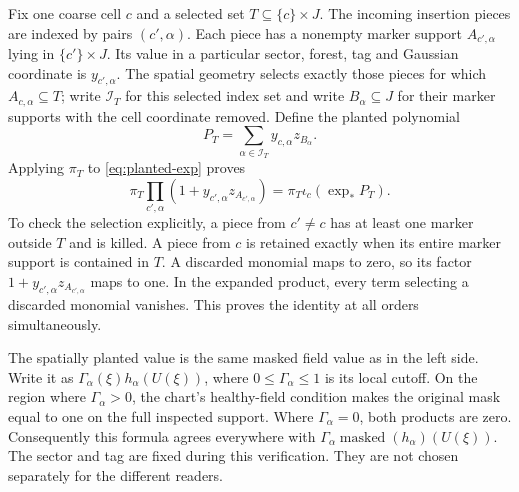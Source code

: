 Fix one coarse cell $c$ and a selected set $T\subseteq\{c\}\times J$.
The incoming insertion pieces are indexed by pairs $(c',\alpha)$.
Each piece has a nonempty marker support $A_{c',\alpha}$ lying in
$\{c'\}\times J$. Its value in a particular sector, forest, tag and
Gaussian coordinate is $y_{c',\alpha}$. The spatial geometry selects
exactly those pieces for which
$A_{c,\alpha}\subseteq T$; write $\mathcal I_T$ for this selected
index set and write $B_\alpha\subseteq J$ for their marker supports
with the cell coordinate removed. Define the planted polynomial
\[
             P_T=\sum_{\alpha\in\mathcal I_T}
                         y_{c,\alpha}z_{B_\alpha}.
\]
Applying $\pi_T$ to \eqref{eq:planted-exp} proves
\begin{equation}\label{eq:planted-selection}
 \pi_T\prod_{c',\alpha}(1+y_{c',\alpha}z_{A_{c',\alpha}})
           =\pi_T\iota_c(\exp_*P_T).
\end{equation}
To check the selection explicitly, a piece from $c'\ne c$ has at least
one marker outside $T$ and is killed. A piece from $c$ is retained
exactly when its entire marker support is contained in $T$. A discarded
monomial maps to zero, so its factor $1+y_{c',\alpha}z_{A_{c',\alpha}}$
maps to one. In the expanded product, every term selecting a discarded
monomial vanishes. This proves the identity at all orders simultaneously.

The spatially planted value is the same masked field value as in the
left side. Write it as $\Gamma_\alpha(\xi)h_\alpha(U(\xi))$, where
$0\le\Gamma_\alpha\le1$ is its local cutoff. On the region where
$\Gamma_\alpha>0$, the chart's healthy-field condition makes the original
mask equal to one on the full inspected support. Where
$\Gamma_\alpha=0$, both products are zero. Consequently this formula
agrees everywhere with
$\Gamma_\alpha\operatorname{masked}(h_\alpha)(U(\xi))$.
The sector and tag are fixed during this verification. They are not
chosen separately for the different readers.

